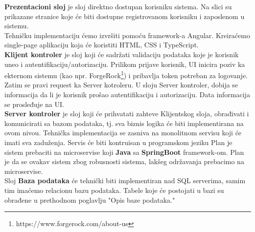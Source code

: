 \documentclass[../main.tex]{subfiles}
\begin{document}
\textbf{Prezentacioni sloj} je sloj direktno dostupan korisniku sistema. Na slici su prikazane stranice koje će biti dostupne registrovanom korisniku i zaposlenom u sistemu. \\
Tehničku implementaciju ćemo izvršiti pomoću framework-a Angular. Kreiraćemo single-page aplikaciju koja će koristiti HTML, CSS i TypeScript. \\
\textbf{Klijent kontroler} je sloj koji će sadržati validaciju podataka koje je korisnik uneo i autentifikaciju/autorizaciju. 
Prilikom prijave korisnik, UI inicira poziv ka ekternom sistemu (kao npr. ForgeRock\footnote{https://www.forgerock.com/about-us}) i pribavlja token potreban za logovanje. Zatim se pravi request ka Server kotroleru. U sloju Server kontroler, dobija se informacija da li je korisnik prošao autentifikaciju i autorizaciju. Data informacija se prosleđuje na UI. \\
\textbf{Server kontroler} je sloj koji će prihvatati zahteve Klijentskog sloja, obrađivati i komunicirati sa bazom podataka, tj. sva biznis logika će biti implementirana na ovom nivou.
Tehnička implementacija se zasniva na monolitnom servisu koji će imati sva zaduženja. Servis će biti kontruisan u programskom jeziku 
Plan je sistem prebaciti na microservise koji \textbf{Java} sa \textbf{SpringBoot} framework-om. 
Plan je da se ovakav sistem zbog robusnosti sistema, lakšeg održavanja prebacimo na microservise.
\\
Sloj \textbf{Baza podataka} će tehnički biti implementiran nad SQL serverima, samim tim imaćemo relacionu bazu podataka. Tabele koje će postojati u bazi su obrađene u prethodnom poglavlju "Opis baze podataka."
\end{document}
